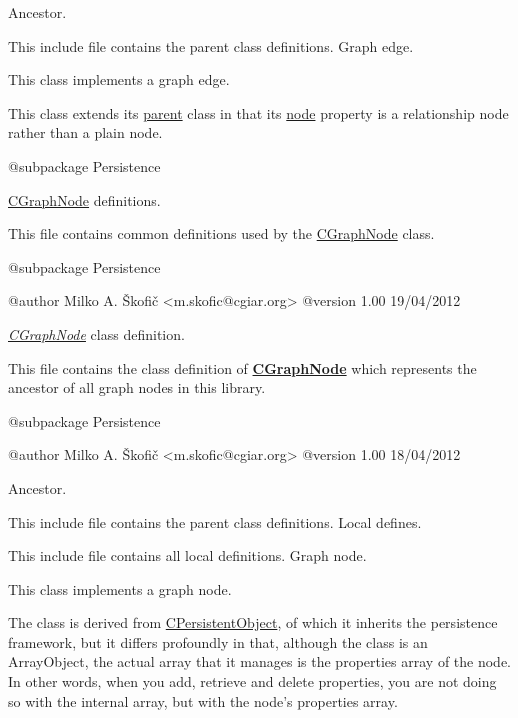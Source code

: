 Ancestor.

This include file contains the parent class definitions. Graph edge.

This class implements a graph edge.

This class extends its \hyperlink{class_c_graph_node}{parent} class in that its \hyperlink{}{node} property is a relationship node rather than a plain node.

\begin{DoxyVerb}    @subpackage     Persistence\end{DoxyVerb}


\hyperlink{class_c_graph_node}{C\-Graph\-Node} definitions.

This file contains common definitions used by the \hyperlink{class_c_graph_node}{C\-Graph\-Node} class.

\begin{DoxyVerb}    @subpackage     Persistence

    @author         Milko A. Škofič <m.skofic@cgiar.org>
    @version        1.00 19/04/2012\end{DoxyVerb}


{\itshape \hyperlink{class_c_graph_node}{C\-Graph\-Node}} class definition.

This file contains the class definition of {\bfseries \hyperlink{class_c_graph_node}{C\-Graph\-Node}} which represents the ancestor of all graph nodes in this library.

\begin{DoxyVerb}    @subpackage     Persistence

    @author         Milko A. Škofič <m.skofic@cgiar.org>
    @version        1.00 18/04/2012\end{DoxyVerb}


Ancestor.

This include file contains the parent class definitions. Local defines.

This include file contains all local definitions. Graph node.

This class implements a graph node.

The class is derived from \hyperlink{class_c_persistent_object}{C\-Persistent\-Object}, of which it inherits the persistence framework, but it differs profoundly in that, although the class is an Array\-Object, the actual array that it manages is the properties array of the node. In other words, when you add, retrieve and delete properties, you are not doing so with the internal array, but with the node's properties array.

